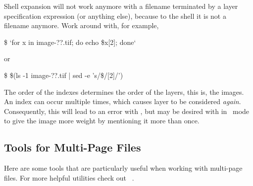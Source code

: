 \begin{geeknote}
  Shell expansion will not work anymore with a filename terminated by a layer specification
  expression (or anything else), because to the shell it is not a filename anymore.  Work around
  with, for example,

  \begin{terminal}
    \$ \app{} `for x in image-??.tif; do echo \$x[2]; done`
  \end{terminal}

  \noindent or

  \begin{terminal}
    \$ \app{} \$(ls -1 image-??.tif | sed -e 's/\$/[2]/')
  \end{terminal}

  The order of the indexes determines the order of the layers, this is, the images.  An index
  can occur multiple times, which causes layer to be considered \emph{again}.  Consequently,
  this will lead to an error with , but may be desired with
   in ~mode to give the image more weight by mentioning it
  more than once.
\end{geeknote}


\subsection[Tools for Multi-Page Files]{\label{sec:tools-for-multi-page-files}%
  Tools for Multi-Page Files}

Here are some tools that are particularly useful when working with multi-page files.  For more
helpful utilities check out \appendixName~.


